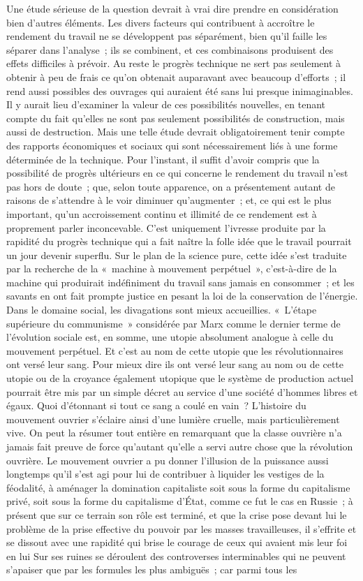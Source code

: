 \documentclass[french,twoside]{book} %
\begin{document}
Une étude sérieuse de la question devrait à vrai dire prendre en considération bien d'autres éléments. Les divers facteurs qui contribuent à accroître le rendement du travail ne se développent pas séparément, bien qu'il faille les séparer dans l'analyse ; ils se combinent, et ces combinaisons produisent des effets difficiles à prévoir. Au reste le progrès technique ne sert pas seulement à obtenir à peu de frais ce qu'on obtenait auparavant avec beaucoup d'efforts ; il rend aussi possibles des ouvrages qui auraient été sans lui presque inimaginables. Il y aurait lieu d'examiner la valeur de ces possibilités nouvelles, en tenant compte du fait qu'elles ne sont pas seulement possibilités de construction, mais aussi de destruction. Mais une telle étude devrait obligatoirement tenir compte des rapports économiques et sociaux qui sont nécessairement liés à une forme déterminée de la technique. Pour l'instant, il suffit d'avoir compris que la possibilité de progrès ultérieurs en ce qui concerne le rendement du travail n'est pas hors de doute ; que, selon toute apparence, on a présentement autant de raisons de s'attendre à le voir diminuer qu'augmenter ; et, ce qui est le plus important, qu'un accroissement continu et illimité de ce rendement est à proprement parler inconcevable. C'est uniquement l'ivresse produite par la rapidité du progrès technique qui a fait naître la folle idée que le travail pourrait un jour devenir superflu. Sur le plan de la science pure, cette idée s'est traduite par la recherche de la « machine à mouvement perpétuel », c'est-à-dire de la machine qui produirait indéfiniment du travail sans jamais en consommer ; et les savants en ont fait prompte justice en pesant la loi de la conservation de l'énergie. Dans le domaine social, les divagations sont mieux accueillies. « L'étape supérieure du communisme » considérée par Marx comme le dernier terme de l'évolution sociale est, en somme, une utopie absolument analogue à celle du mouvement perpétuel. Et c'est au nom de cette utopie que les révolutionnaires ont versé leur sang. Pour mieux dire ils ont versé leur sang au nom ou de cette utopie ou de la croyance également utopique que le système de production actuel pourrait être mis par un simple décret au service d'une société d'hommes libres et égaux. Quoi d'étonnant si tout ce sang a coulé en vain ? L'histoire du mouvement ouvrier s'éclaire ainsi d'une lumière cruelle, mais particulièrement vive. On peut la résumer tout entière en remarquant que la classe ouvrière n'a jamais fait preuve de force qu'autant qu'elle a servi autre chose que la révolution ouvrière. Le mouvement ouvrier a pu donner l'illusion de la puissance aussi longtemps qu'il s'est agi pour lui de contribuer à liquider les vestiges de la féodalité, à aménager la domination capitaliste soit sous la forme du capitalisme privé, soit sous la forme du capitalisme d'État, comme ce fut le cas en Russie ; à présent que sur ce terrain son rôle est terminé, et que la crise pose devant lui le problème de la prise effective du pouvoir par les masses travailleuses, il s'effrite et se dissout avec une rapidité qui brise le courage de ceux qui avaient mis leur foi en lui Sur ses ruines se déroulent des controverses interminables qui ne peuvent s'apaiser que par les formules les plus ambiguës ; car parmi tous les 
\end{document}
